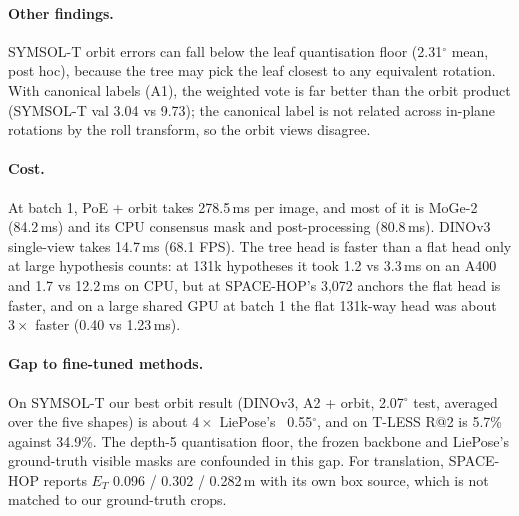 \paragraph{Other findings.}
SYMSOL-T orbit errors can fall below the leaf quantisation floor (2.31$^\circ$ mean, post hoc), because the tree may pick the leaf closest to any equivalent rotation. With canonical labels (A1), the weighted vote is far better than the orbit product (SYMSOL-T val 3.04 vs 9.73); the canonical label is not related across in-plane rotations by the roll transform, so the orbit views disagree.

\paragraph{Cost.}
At batch 1, PoE + orbit takes 278.5\,ms per image, and most of it is MoGe-2 (84.2\,ms) and its CPU consensus mask and post-processing (80.8\,ms). DINOv3 single-view takes 14.7\,ms (68.1 FPS). The tree head is faster than a flat head only at large hypothesis counts: at 131k hypotheses it took 1.2 vs 3.3\,ms on an A400 and 1.7 vs 12.2\,ms on CPU, but at SPACE-HOP's 3,072 anchors the flat head is faster, and on a large shared GPU at batch 1 the flat 131k-way head was about $3\times$ faster (0.40 vs 1.23\,ms).

\paragraph{Gap to fine-tuned methods.}
On SYMSOL-T our best orbit result (DINOv3, A2 + orbit, 2.07$^\circ$ test, averaged over the five shapes) is about $4\times$ LiePose's~\cite{hsiao2024liepose} 0.55$^\circ$, and on T-LESS R@2 is 5.7\% against 34.9\%. The depth-5 quantisation floor, the frozen backbone and LiePose's ground-truth visible masks are confounded in this gap. For translation, SPACE-HOP reports $E_T$ 0.096 / 0.302 / 0.282\,m with its own box source, which is not matched to our ground-truth crops.

